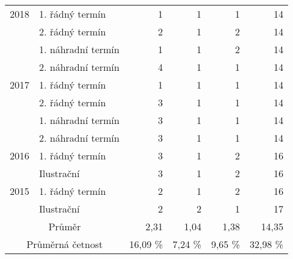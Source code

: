 \begin{table}[htbp]
\begin{tabular}{|l|l|r|r|r|r|}
        \multicolumn{ 1}{|c|}{2018} & 1. řádný termín    & 1 & 1 & 1 & 14 \\ \cline{ 2- 6}
        \multicolumn{ 1}{|l|}{}     & 2. řádný termín    & 2 & 1 & 2 & 14 \\ \cline{ 2- 6}
        \multicolumn{ 1}{|l|}{}     & 1. náhradní termín & 1 & 1 & 2 & 14 \\ \cline{ 2- 6}
        \multicolumn{ 1}{|l|}{}     & 2. náhradní termín & 4 & 1 & 1 & 14 \\ \hline
        \multicolumn{ 1}{|c|}{2017} & 1. řádný termín    & 1 & 1 & 1 & 14 \\ \cline{ 2- 6}
        \multicolumn{ 1}{|l|}{}     & 2. řádný termín    & 3 & 1 & 1 & 14 \\ \cline{ 2- 6}
        \multicolumn{ 1}{|l|}{}     & 1. náhradní termín & 3 & 1 & 1 & 14 \\ \cline{ 2- 6}
        \multicolumn{ 1}{|l|}{}     & 2. náhradní termín & 3 & 1 & 1 & 14 \\ \hline
        \multicolumn{ 1}{|c|}{2016} & 1. řádný termín    & 3 & 1 & 2 & 16 \\ \cline{ 2- 6}
        \multicolumn{ 1}{|l|}{}     & Ilustrační         & 3 & 1 & 2 & 16 \\ \hline
        \multicolumn{ 1}{|c|}{2015} & 1. řádný termín    & 2 & 1 & 2 & 16 \\ \cline{ 2- 6}
        \multicolumn{ 1}{|l|}{}     & Ilustrační         & 2 & 2 & 1 & 17 \\ \hline
        \multicolumn{ 2}{|c|}{Průměr} & 2,31 & 1,04 & 1,38 & 14,35 \\ \hline
        \multicolumn{ 2}{|c|}{Průměrná četnost} & 16,09 \% & 7,24 \% & 9,65 \% & 32,98 \% \\ \hline
    \end{tabular}
    \label{tabulka8-1}
\end{table}

